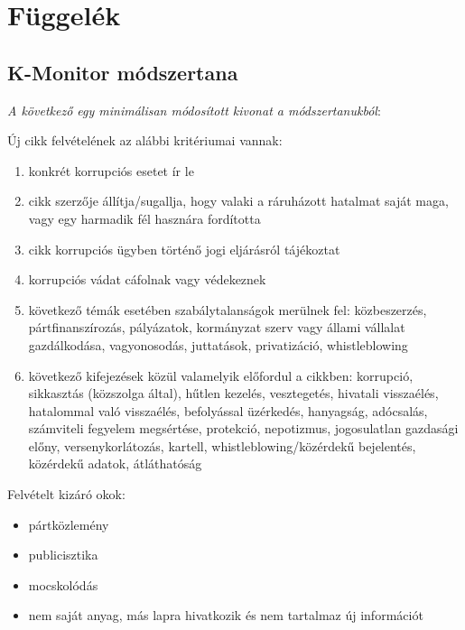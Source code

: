 \appendix

\chapter*{Függelék}
\setcounter{chapter}{6}  %
\setcounter{equation}{0} %

\section{K-Monitor módszertana}
\label{appendix:kmonitor-methodology}

\emph{A következő egy minimálisan módosított kivonat a módszertanukból}:


Új cikk felvételének az alábbi kritériumai vannak:

\begin{enumerate}
	\item konkrét korrupciós esetet ír le
	\item cikk szerzője állítja/sugallja, hogy valaki a ráruházott hatalmat saját maga, vagy egy harmadik fél hasznára fordította
	\item cikk korrupciós ügyben történő jogi eljárásról tájékoztat
	\item korrupciós vádat cáfolnak vagy védekeznek
	\item következő témák esetében szabálytalanságok merülnek fel: közbeszerzés, pártfinanszírozás, pályázatok, kormányzat szerv vagy állami vállalat gazdálkodása, vagyonosodás, juttatások, privatizáció, whistleblowing
	\item következő kifejezések közül valamelyik előfordul a cikkben: korrupció, sikkasztás (közszolga által), hűtlen kezelés, vesztegetés, hivatali visszaélés, hatalommal való visszaélés, befolyással üzérkedés, hanyagság, adócsalás, számviteli fegyelem megsértése, protekció, nepotizmus, jogosulatlan gazdasági előny, versenykorlátozás, kartell, whistleblowing/közérdekű bejelentés, közérdekű adatok, átláthatóság
\end{enumerate}

Felvételt kizáró okok:
\begin{itemize}
	\item pártközlemény
	\item publicisztika
	\item mocskolódás
	\item nem saját anyag, más lapra hivatkozik és nem tartalmaz új információt
\end{itemize}

